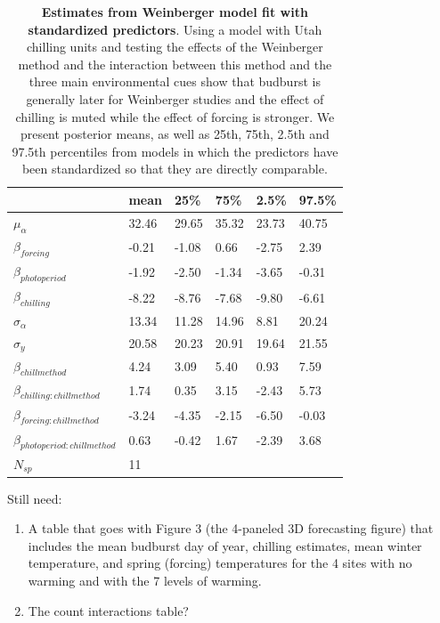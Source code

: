 \documentclass{article}
\begin{document}
\begin{footnotesize}
\begin{table}[ht]
\centering
\caption{\textbf{Estimates from Weinberger model fit with standardized predictors}. Using a model with Utah chilling units and testing the effects of the Weinberger method and the interaction between this method and the three main environmental cues  show that budburst is generally later for Weinberger studies and the effect of chilling is muted while the effect of forcing is stronger. We present posterior means, as well as 25th, 75th, 2.5th and 97.5th percentiles from models in which the predictors have been standardized so that they are directly comparable.} 
\label{tab:methods}
\begingroup\footnotesize
\begin{tabular}{|p{}|p{}|p{}|p{}|p{}|p{}|}
  \hline
 & mean & 25\% & 75\% & 2.5\% & 97.5\% \\ 
  \hline
$\mu_{\alpha}$ & 32.46 & 29.65 & 35.32 & 23.73 & 40.75 \\ 
  $\beta_{forcing}$ & -0.21 & -1.08 & 0.66 & -2.75 & 2.39 \\ 
  $\beta_{photoperiod}$ & -1.92 & -2.50 & -1.34 & -3.65 & -0.31 \\ 
  $\beta_{chilling}$ & -8.22 & -8.76 & -7.68 & -9.80 & -6.61 \\ 
  $\sigma_{\alpha}$ & 13.34 & 11.28 & 14.96 & 8.81 & 20.24 \\ 
  $\sigma_{y}$ & 20.58 & 20.23 & 20.91 & 19.64 & 21.55 \\ 
  $\beta_{chillmethod}$ & 4.24 & 3.09 & 5.40 & 0.93 & 7.59 \\ 
  $\beta_{chilling : chillmethod}$ & 1.74 & 0.35 & 3.15 & -2.43 & 5.73 \\ 
  $\beta_{forcing : chillmethod}$ & -3.24 & -4.35 & -2.15 & -6.50 & -0.03 \\ 
  $\beta_{photoperiod : chillmethod}$ & 0.63 & -0.42 & 1.67 & -2.39 & 3.68 \\ 
   \hline
$N_{sp}$ & 11 &  &  &  &  \\ 
   \hline
\end{tabular}
\endgroup
\end{table}\end{footnotesize} 

Still need: 
\begin{enumerate}

\item A table that goes with Figure 3 (the 4-paneled 3D forecasting figure) that includes the mean budburst day of year, chilling estimates, mean winter temperature, and spring (forcing) temperatures for the 4 sites with no warming and with the 7 levels of warming.
\item The count interactions table?
% 
\end{enumerate}
\end{document}
